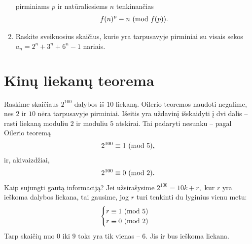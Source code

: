 \begin{enumerate}
    pirminiams $p$ ir natūraliesiems $n$ tenkinančias $$f(n)^p \equiv n
    \ (\text{mod } f(p)).$$
    \item \text{[IMO 2005]} Raskite sveikuosius skaičius, kurie yra
    tarpusavyje pirminiai su visais sekos $a_n = 2^n + 3^n + 6^n - 1$
    nariais.

\end{enumerate}
\newpage

\section{Kinų liekanų teorema}

Raskime skaičiaus $2^{100}$ dalybos iš $10$ liekaną. Oilerio teoremos
naudoti negalime, nes $2$ ir $10$ nėra tarpusavyje pirminiai. Išeitis yra
uždavinį išskaidyti į dvi dalis -- rasti liekaną moduliu $2$ ir moduliu
$5$ atskirai. Tai padaryti nesunku -- pagal Oilerio teoremą $$2^{100} \equiv
1 \ (\text{mod } 5),$$ ir, akivaizdžiai, $$2^{100} \equiv 0 \ (\text{mod } 2).$$ Kaip sujungti gautą
informaciją? Jei užsirašysime $2^{100} = 10k + r,$ kur $r$ yra ieškoma
dalybos liekana, tai gausime, jog $r$ turi tenkinti du lyginius vienu metu:
$$\begin{cases}
  r \equiv 1 \ (\text{mod } 5) \\
  r \equiv 0 \ (\text{mod } 2)
\end{cases}$$
Tarp skaičių nuo $0$ iki $9$ toks yra tik vienas -- $6$. Jis ir bus ieškoma
liekana.


